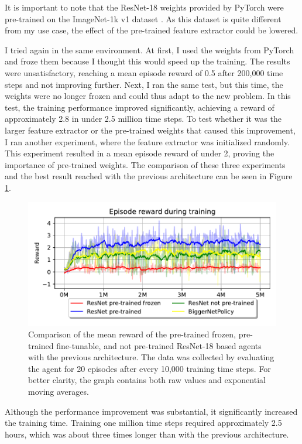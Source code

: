 \documentclass[
  digital,     %
  oneside,     %
  nosansbold,  %
  nocolorbold, %
  lof,         %
  lot,         %
]{fithesis4}
\begin{document}
It is important to note that the ResNet-18 weights provided by PyTorch were pre-trained on the ImageNet-1k v1 dataset \cite{torchvision2016}. As this dataset is quite different from my use case, the effect of the pre-trained feature extractor could be lowered.

I tried again in the same environment. At first, I used the weights from PyTorch and froze them because I thought this would speed up the training. The results were unsatisfactory, reaching a mean episode reward of 0.5 after 200,000 time steps and not improving further. Next, I ran the same test, but this time, the weights were no longer frozen and could thus adapt to the new problem. In this test, the training performance improved significantly, achieving a reward of approximately 2.8 in under 2.5 million time steps.
To test whether it was the larger feature extractor or the pre-trained weights that caused this improvement, I ran another experiment, where the feature extractor was initialized randomly. This experiment resulted in a mean episode reward of under 2, proving the importance of pre-trained weights. The comparison of these three experiments and the best result reached with the previous architecture can be seen in Figure \ref{fig:v4_resnet_graph}. 

\begin{figure}
    \includegraphics[width=1\linewidth]{graphs/v4_resnet_graph.pdf}
    \caption{Comparison of the mean reward of the pre-trained frozen, pre-trained fine-tunable, and not pre-trained ResNet-18 based agents with the previous architecture. The data was collected by evaluating the agent for 20 episodes after every 10,000 training time steps. For better clarity, the graph contains both raw values and exponential moving averages.}
    \label{fig:v4_resnet_graph}
\end{figure}

Although the performance improvement was substantial, it significantly increased the training time. Training one million time steps required approximately 2.5 hours, which was about three times longer than with the previous architecture.
\end{document}
